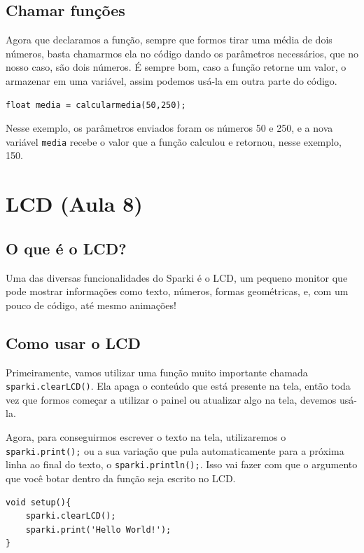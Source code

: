 \documentclass[conference]{IEEEtran}
\begin{document}
\subsection{Chamar funções}
Agora que declaramos a função, sempre que formos tirar uma média de dois números, basta chamarmos ela no código dando os parâmetros necessários, que no nosso caso, são dois números. É sempre bom, caso a função retorne um valor, o armazenar em uma variável, assim podemos usá-la em outra parte do código.
\vspace{0.2cm}

\begin{lstlisting}[caption={Chamando uma função}]
float media = calcularmedia(50,250);
\end{lstlisting}

\vspace{0.2cm}
Nesse exemplo, os parâmetros enviados foram os números 50 e 250, e a nova variável \texttt{media} recebe o valor que a função calculou e retornou, nesse exemplo, 150.


\vspace{0.5cm}
\section{LCD (Aula 8)}
\subsection{O que é o LCD?}
Uma das diversas funcionalidades do Sparki é o LCD, um pequeno monitor que pode mostrar informações como texto, números, formas geométricas, e, com um pouco de código, até mesmo animações! 
\subsection{Como usar o LCD}
Primeiramente, vamos utilizar uma função muito importante chamada \texttt{sparki.clearLCD()}. Ela apaga o conteúdo que está presente na tela, então toda vez que formos começar a utilizar o painel ou atualizar algo na tela, devemos usá-la.

Agora, para conseguirmos escrever o texto na tela, utilizaremos o \texttt{sparki.print();} ou a sua variação que pula automaticamente para a próxima linha ao final do texto, o \texttt{sparki.println();}. Isso vai fazer com que o argumento que você botar dentro da função seja escrito no LCD.

\begin{lstlisting}[caption={Algoritmo para escrever 'Hello World!'}]
void setup(){
    sparki.clearLCD();
    sparki.print('Hello World!');
}
\end{lstlisting}
\end{document}
